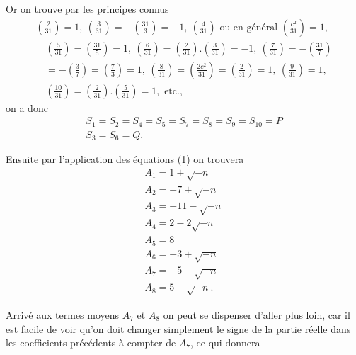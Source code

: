 \documentclass[11pt,a4paper]{article}
\begin{document}
Or on trouve par les principes connus
\[
\begin{array}{l}
\left(\frac{2}{31}\right) = 1,\ \left(\frac{3}{31}\right) = -\left(\frac{31}{3}\right) = -1,\ \left(\frac{4}{31}\right) \text{ ou en général } \left(\frac{c^2}{31}\right) = 1, \\
\quad \left(\frac{5}{31}\right) = \left(\frac{31}{5}\right) = 1,\ \left(\frac{6}{31}\right) = \left(\frac{2}{31}\right).\left(\frac{3}{31}\right) = -1,\ \left(\frac{7}{31}\right) = -\left(\frac{31}{7}\right) \\
\quad = -\left(\frac{3}{7}\right) = \left(\frac{7}{3}\right) = 1,\ \left(\frac{8}{31}\right) = \left(\frac{2c^2}{31}\right) = \left(\frac{2}{31}\right) = 1,\ \left(\frac{9}{31}\right) = 1, \\
\quad \left(\frac{10}{31}\right) = \left(\frac{2}{31}\right).\left(\frac{5}{31}\right) = 1, \text{ etc.},
\end{array}
\]
on a donc
\[
\begin{array}{l}
S_1 = S_2 = S_4 = S_5 = S_7 = S_8 = S_9 = S_{10} = P \\
S_3 = S_6 = Q.
\end{array}
\]

Ensuite par l'application des équations (1) on trouvera
\[
\begin{array}{l}
A_1 = 1 + \sqrt{-n} \\
A_2 = -7 + \sqrt{-n} \\
A_3 = -11 - \sqrt{-n} \\
A_4 = 2 - 2\sqrt{-n} \\
A_5 = 8 \\
A_6 = -3 + \sqrt{-n} \\
A_7 = -5 - \sqrt{-n} \\
A_8 = 5 - \sqrt{-n}.
\end{array}
\]

Arrivé aux termes moyens $A_7$ et $A_8$ on peut se dispenser d'aller plus
loin, car il est facile de voir qu'on doit changer simplement le signe de la
partie réelle dans les coefficients précédents à compter de $A_7$, ce qui
donnera
\end{document}
